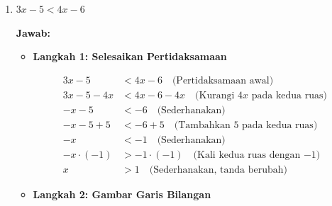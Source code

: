 \documentclass[10pt,a4paper]{article}
\newcounter{eqblock}
\newcommand{\reseteq}{%
  \stepcounter{eqblock}%
  \setcounter{equation}{0}%
  \renewcommand{\theHequation}{\arabic{eqblock}.\arabic{equation}}%
}
\begin{document}
\begin{enumerate}
\begin{itemize}
\item \textbf{Langkah 3: Tentukan HP}

$\text{HP} = \left[-\frac{10}{3}, \infty\right)$

\end{itemize}

\item $3x - 5 < 4x - 6$

\textbf{Jawab:}

\begin{itemize}
\item \textbf{Langkah 1: Selesaikan Pertidaksamaan}

\reseteq

\begin{align}
3x - 5 &< 4x - 6 \quad \text{(Pertidaksamaan awal)} \\
3x - 5 - 4x &< 4x - 6 - 4x \quad \text{(Kurangi $4x$ pada kedua ruas)} \\
-x - 5 &< -6 \quad \text{(Sederhanakan)} \\
-x - 5 + 5 &< -6 + 5 \quad \text{(Tambahkan 5 pada kedua ruas)} \\
-x &< -1 \quad \text{(Sederhanakan)} \\
-x \cdot (-1) &> -1 \cdot (-1) \quad \text{(Kali kedua ruas dengan $-1$)} \\
x &> 1 \quad \text{(Sederhanakan, tanda berubah)}
\end{align}

\item \textbf{Langkah 2: Gambar Garis Bilangan}

\begin{center}
\end{center}


\end{itemize}
\end{enumerate}
\end{document}

